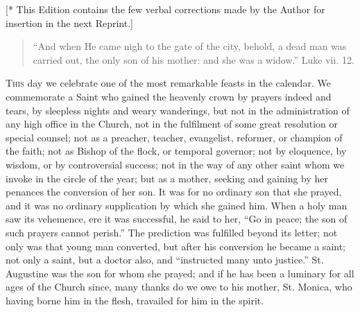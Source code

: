 [* This Edition contains the few
verbal corrections made by the Author for insertion in
the next Reprint.]


\begin{quote}

``And when He came nigh to the gate of the
city, behold, a dead man was carried out, the only
son of his mother: and she was a widow.'' Luke
vii. 12.

\end{quote}

T\textsc{his} day we celebrate one of the most remarkable
feasts in the calendar. We commemorate a Saint who gained
the heavenly crown by prayers indeed and tears, by
sleepless nights and weary wanderings, but not in the
administration of any high office in the Church, not in
the fulfilment of some great resolution or special
counsel; not as a preacher, teacher, evangelist,
reformer, or champion of the faith; not as Bishop of the
flock, or temporal governor; not by eloquence, by wisdom,
or by controversial success; not in the way of any other
saint whom we invoke in the circle of the year; but as a
mother, seeking and gaining by her penances the
conversion of her son. It was for no ordinary son that
she prayed, and it was no ordinary supplication by which
she gained him. When a holy man saw its vehemence, ere it
was successful, he said to her, ``Go in peace; the
son of such prayers cannot perish.'' The prediction
was fulfilled beyond its letter; not only was that young
man converted, but after his conversion he became a
saint; not only a saint, but a doctor also, and
``instructed many unto justice.'' St. Augustine
was the son for whom she prayed; and if he has been a
luminary for all ages of the Church since, many thanks do
we owe to his mother, St. Monica, who having borne him in
the flesh, travailed for him in the spirit.

